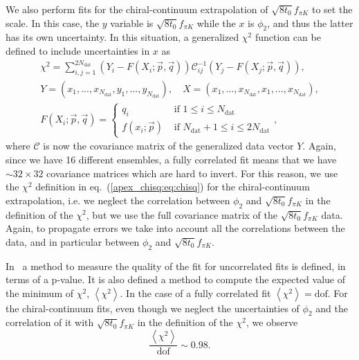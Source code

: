 We also perform fits for the chiral-continuum extrapolation of $\sqrt{8t_0}f_{\pi K}$ to set the scale. In this case, the $y$ variable is $\sqrt{8t_0}f_{\pi K}$ while the $x$ is $\phi_2$, and thus the latter has its own uncertainty. In this situation, a generalized $\chi^2$ function can be defined to include uncertainties in $x$ as
\begin{gather}
\label{apex_chisq:eq:chisq_generalized}
\chi^2=\sum_{i,j=1}^{2N_{\textrm{dat}}}\left(Y_i-F(X_i;\vec{p},\vec{q})\right)\mathcal{C}_{ij}^{-1}\left(Y_j-F(X_j;\vec{p},\vec{q})\right), \\
Y=(x_1,...,x_{N_{\textrm{dat}}},y_1,...,y_{N_{\textrm{dat}}}), \quad
X=(x_1,...,x_{N_{\textrm{dat}}},x_1,...,x_{N_{\textrm{dat}}}), \\
F(X_i;\vec{p},\vec{q})=\left\{\begin{matrix}
q_i & \textrm{ if $1\leq i\leq N_{\textrm{dat}}$} \\ 
f(x_i;\vec{p}) & \textrm{ if $N_{\textrm{dat}}+1\leq i\leq 2N_{\textrm{dat}}$}
\end{matrix}\right.,
\end{gather}
where $\mathcal{C}$ is now the covariance matrix of the generalized data vector $Y$. Again, since we have 16 different ensembles, a fully correlated fit means that we have $\sim32\times32$ covariance matrices which are hard to invert. For this reason, we use the $\chi^2$ definition in eq.~(\ref{apex_chisq:eq:chisq}) for the chiral-continuum extrapolation, i.e. we neglect the correlation between $\phi_2$ and $\sqrt{8t_0}f_{\pi K}$ in the definition of the $\chi^2$, but we use the full covariance matrix of the $\sqrt{8t_0}f_{\pi K}$ data. Again, to propagate errors we take into account all the correlations between the data, and in particular between $\phi_2$ and $\sqrt{8t_0}f_{\pi K}$.

In~\cite{chi_exp} a method to measure the quality of the fit for uncorrelated fits is defined, in terms of a p-value. It is also defined a method to compute the expected value of the minimum of $\chi^2$, $\left<\chi^2\right>$. In the case of a fully correlated fit $\left<\chi^2\right>={\textrm{dof}}$. For the chiral-continuum fits, even though we neglect the uncertainties of $\phi_2$ and the correlation of it with $\sqrt{8t_0}f_{\pi K}$ in the definition of the $\chi^2$, we observe
\begin{equation}
\frac{\left<\chi^2\right>}{{\textrm{dof}}}\sim0.98.
\end{equation}


